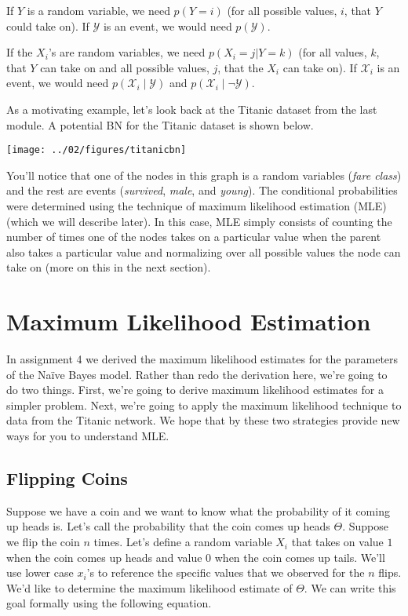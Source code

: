 \documentclass{tufte-handout}
\begin{document}
\bi
\item If $Y$ is a random variable, we need $p(Y=i)$ (for all possible values, $i$, that $Y$ could take on).  If $\mathcal{Y}$ is an event, we would need $p(\mathcal{Y})$.
\item If the $X_i$'s are random variables, we need $p(X_i=j | Y=k)$ (for all values, $k$, that $Y$ can take on and all possible values, $j$, that the $X_i$ can take on).  If $\mathcal{X}_i$ is an event, we would need $p(\mathcal{X}_i \mid \mathcal{Y})$ and $p(\mathcal{X}_i \mid \neg \mathcal{Y})$.
\ei

As a motivating example, let's look back at the Titanic dataset from the last module.  A potential BN for the Titanic dataset is shown below.

\begin{center}
\texttt{[image: ../02/figures/titanicbn]}
\end{center}

You'll notice that one of the nodes in this graph is a random variables (\emph{fare class}) and the rest are events (\emph{survived}, \emph{male}, and \emph{young}).  The conditional probabilities were determined using the technique of maximum likelihood estimation (MLE) (which we will describe later).  In this case, MLE simply consists of counting the number of times one of the nodes takes on a particular value when the parent also takes a particular value and normalizing over all possible values the node can take on (more on this in the next section).

\section{Maximum Likelihood Estimation}

In assignment 4 we derived the maximum likelihood estimates for the parameters of the Na\"ive Bayes model.  Rather than redo the derivation here, we're going to do two things.  First, we're going to derive maximum likelihood estimates for a simpler problem.  Next, we're going to apply the maximum likelihood technique to data from the Titanic network.  We hope that by these two strategies provide new ways for you to understand MLE.

\subsection{Flipping Coins}

Suppose we have a coin and we want to know what the probability of it coming up heads is.  Let's call the probability that the coin comes up heads $\Theta$.  Suppose we flip the coin $n$ times.  Let's define a random variable $X_i$ that takes on value $1$ when the coin comes up heads and value $0$ when the coin comes up tails.  We'll use lower case $x_i$'s to reference the specific values that we observed for the $n$ flips.  We'd like to determine the maximum likelihood estimate of $\Theta$.  We can write this goal formally using the following equation.
\end{document}
